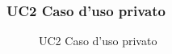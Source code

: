 \subsubsection{UC2 Caso d'uso privato}
\begin{figure}[H]
\centering
\noindent{}
\caption{UC2 Caso d'uso privato}
\end{figure}
